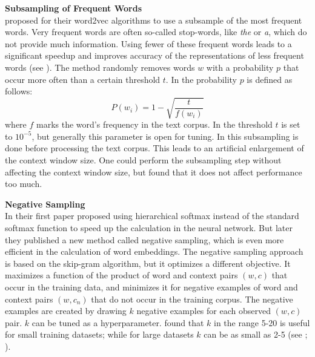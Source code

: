 \documentclass[]{krantz}
\begin{document}
\textbf{Subsampling of Frequent Words}\\
\citet{Mikolov.2013c} proposed for their word2vec algorithms to use a subsample of the most frequent words. Very frequent words are often so-called stop-words, like \emph{the} or \emph{a}, which do not provide much information. Using fewer of these frequent words leads to a significant speedup and improves accuracy of the representations of less frequent words (see \citet{Mikolov.2013c}). The method randomly removes words \(w\) with a probability \(p\) that occur more often than a certain threshold \(t\). In \citet{Mikolov.2013c} the probability \(p\) is defined as follows:
\[P(w_i) = 1-\sqrt{\frac{t}{f(w_i)}}\]
where \(f\) marks the word's frequency in the text corpus. In \citet{Mikolov.2013c} the threshold \(t\) is set to \(10^{-5}\), but generally this parameter is open for tuning. In \citet{Mikolov.2013c} this subsampling is done before processing the text corpus. This leads to an artificial enlargement of the context window size. One could perform the subsampling step without affecting the context window size, but \citet{levy2015improving} found that it does not affect performance too much.

\textbf{Negative Sampling}\\
In their first paper \citet{mikolov2013efficient} proposed using hierarchical softmax instead of the standard softmax function to speed up the calculation in the neural network. But later they published a new method called negative sampling, which is even more efficient in the calculation of word embeddings. The negative sampling approach is based on the skip-gram algorithm, but it optimizes a different objective. It maximizes a function of the product of word and context pairs \((w, c)\) that occur in the training data, and minimizes it for negative examples of word and context pairs \((w, c_n)\) that do not occur in the training corpus. The negative examples are created by drawing \(k\) negative examples for each observed \((w, c)\) pair. \(k\) can be tuned as a hyperparameter. \citet{Mikolov.2013c} found that \(k\) in the range 5-20 is useful for small training datasets; while for large datasets \(k\) can be as small as 2-5 (see \citet{Mikolov.2013c}; \citet{goldberg2014word2vec}).
\end{document}
